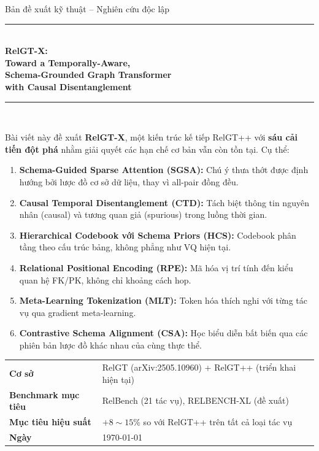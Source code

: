 \documentclass[12pt,a4paper]{article}
\begin{document}
\begin{titlepage}
\centering\vspace*{0.5cm}

{\small\color{gray} Bản đề xuất kỹ thuật -- Nghiên cứu độc lập}\\[0.5em]
\rule{\textwidth}{3pt}\\[0.6em]
{\Huge\bfseries\color{blue!75!black}
  RelGT-X:\\[0.3em]
  \Large Toward a Temporally-Aware,\\
  Schema-Grounded Graph Transformer\\
  with Causal Disentanglement
}\\[0.5em]
\rule{\textwidth}{1.5pt}\\[1.5em]

\begin{tcolorbox}[colback=gray!8,colframe=gray!40,width=0.95\textwidth,
  title={\bfseries Tóm tắt đóng góp},fonttitle=\bfseries]
Bài viết này đề xuất \textbf{RelGT-X}, một kiến trúc kế tiếp RelGT++ với
\textbf{sáu cải tiến đột phá} nhằm giải quyết các hạn chế cơ bản vẫn còn
tồn tại. Cụ thể:
\begin{enumerate}[nosep,leftmargin=1.5em]
  \item \textbf{Schema-Guided Sparse Attention (SGSA):} Chú ý thưa thớt
        được định hướng bởi lược đồ cơ sở dữ liệu, thay vì all-pair đồng đều.
  \item \textbf{Causal Temporal Disentanglement (CTD):} Tách biệt thông tin
        nguyên nhân (causal) và tương quan giả (spurious) trong luồng thời gian.
  \item \textbf{Hierarchical Codebook với Schema Priors (HCS):} Codebook phân
        tầng theo cấu trúc bảng, không phẳng như VQ hiện tại.
  \item \textbf{Relational Positional Encoding (RPE):} Mã hóa vị trí tính đến
        kiểu quan hệ FK/PK, không chỉ khoảng cách hop.
  \item \textbf{Meta-Learning Tokenization (MLT):} Token hóa thích nghi với
        từng tác vụ qua gradient meta-learning.
  \item \textbf{Contrastive Schema Alignment (CSA):} Học biểu diễn bất biến
        qua các phiên bản lược đồ khác nhau của cùng thực thể.
\end{enumerate}
\end{tcolorbox}

\vspace{1.5em}
\begin{tabular}{ll}
\toprule
\textbf{Cơ sở} & RelGT (arXiv:2505.10960) + RelGT++ (triển khai hiện tại) \\
\textbf{Benchmark mục tiêu} & RelBench (21 tác vụ), RELBENCH-XL (đề xuất) \\
\textbf{Mục tiêu hiệu suất} & $+8\sim15\%$ so với RelGT++ trên tất cả loại tác vụ \\
\textbf{Ngày} & \today \\
\bottomrule
\end{tabular}
\vfill
\end{titlepage}
\end{document}
